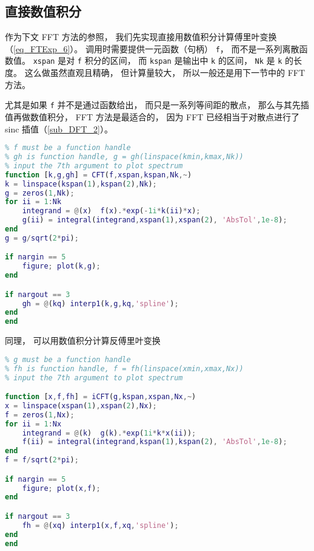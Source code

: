 

\subsection{直接数值积分}
作为下文 FFT 方法的参照， 我们先实现直接用数值积分计算傅里叶变换（\autoref{eq_FTExp_6}）。 调用时需要提供一元函数（句柄） \verb|f|， 而不是一系列离散函数值。 \verb|xspan| 是对 \verb|f| 积分的区间， 而 \verb|kspan| 是输出中 \verb|k| 的区间， \verb|Nk| 是 \verb|k| 的长度。 这么做虽然直观且精确， 但计算量较大， 所以一般还是用下一节中的 FFT 方法。

尤其是如果 \verb|f| 并不是通过函数给出， 而只是一系列等间距的散点， 那么与其先插值再做数值积分， FFT 方法是最适合的， 因为 FFT 已经相当于对散点进行了 sinc 插值（\autoref{sub_DFT_2}）。

\begin{lstlisting}[language=matlab, caption=CFT.m]
% Continuous Fourier Transform by Integration
% f must be a function handle
% gh is function handle, g = gh(linspace(kmin,kmax,Nk))
% input the 7th argument to plot spectrum
function [k,g,gh] = CFT(f,xspan,kspan,Nk,~)
k = linspace(kspan(1),kspan(2),Nk);
g = zeros(1,Nk);
for ii = 1:Nk
    integrand = @(x)  f(x).*exp(-1i*k(ii)*x);
    g(ii) = integral(integrand,xspan(1),xspan(2), 'AbsTol',1e-8);
end
g = g/sqrt(2*pi);

if nargin == 5
    figure; plot(k,g);
end

if nargout == 3
    gh = @(kq) interp1(k,g,kq,'spline');
end
end
\end{lstlisting}
同理， 可以用数值积分计算反傅里叶变换
\begin{lstlisting}[language=matlab, caption=iCFT.m]
% Continuous Fourier Transform by Integration
% g must be a function handle
% fh is function handle, f = fh(linspace(xmin,xmax,Nx))
% input the 7th argument to plot spectrum

function [x,f,fh] = iCFT(g,kspan,xspan,Nx,~)
x = linspace(xspan(1),xspan(2),Nx);
f = zeros(1,Nx);
for ii = 1:Nx
    integrand = @(k)  g(k).*exp(1i*k*x(ii));
    f(ii) = integral(integrand,kspan(1),kspan(2), 'AbsTol',1e-8);
end
f = f/sqrt(2*pi);

if nargin == 5
    figure; plot(x,f);
end

if nargout == 3
    fh = @(xq) interp1(x,f,xq,'spline');
end
end
\end{lstlisting}

